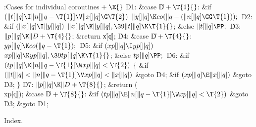 \Y\B\4:Cases for individual coroutines\X${}\mathrel+\E{}$\6
\4\.{D1}:\5
\&{case} \|D${}+\T{1}{}$:\5
\&{if} ${}(\|t[\|q]\I\|n[\|q-\T{1}]\V\|x[\|q]\G\T{2}){}$\1\5
${}\|y[\|q]\K\\{co}(\|q-(\|n[\|q]\GG\T{1}));{}$\2\6
\4\.{D2}:\5
\&{if} ${}(\|x[\|q]\I\|y[\|q]){}$\1\5
${}\|x[\|q]\K\|y[\|q],\39\|t[\|q]\K\T{1}{}$;\5
\2\&{else}\1\5
${}\|t[\|q]\PP;{}$\2\6
\4\.{D3}:\5
${}\|p[\|q]\K\|D+\T{4}{}$;\5
\&{return} \|x[\|q];\6
\4\.{D4}:\5
\&{case} \|D${}+\T{4}{}$:\5
${}\\{yp}[\|q]\K\\{co}(\|q-\T{1});{}$\6
\4\.{D5}:\5
\&{if} ${}(\\{xp}[\|q]\I\\{yp}[\|q]){}$\1\5
${}\\{xp}[\|q]\K\\{yp}[\|q],\39\\{tp}[\|q]\K\T{1}{}$;\5
\2\&{else}\1\5
${}\\{tp}[\|q]\PP;{}$\2\6
\4\.{D6}:\5
\&{if} ${}(\\{tp}[\|q]\E\|n[\|q-\T{1}]\W\\{xp}[\|q]<\T{2}){}$\5
${}\{{}$\1\6
\&{if} ${}(\|t[\|q]<\|n[\|q-\T{1}]\V\\{xp}[\|q]<\|x[\|q]){}$\1\5
\&{goto} \.{D4};\2\6
\&{if} ${}(\\{xp}[\|q]\E\|x[\|q]){}$\1\5
\&{goto} \.{D3};\2\6
\4${}\}{}$\2\6
\4\.{D7}:\5
${}\|p[\|q]\K\|D+\T{8}{}$;\5
\&{return} (\\{xp}[\|q]);\6
\4\&{case} \|D${}+\T{8}{}$:\5
\&{if} ${}(\\{tp}[\|q]\E\|n[\|q-\T{1}]\W\\{xp}[\|q]<\T{2}){}$\1\5
\&{goto} \.{D3};\2\6
\&{goto} \.{D1};\par
\fi

Index.
\fi

\inx
\fin
\con
